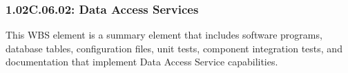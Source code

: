 \subsubsection*{1.02C.06.02: Data Access Services}

This WBS element is a summary element that includes software programs, database tables, configuration files, unit tests, component integration tests, and documentation that implement Data Access Service capabilities.
